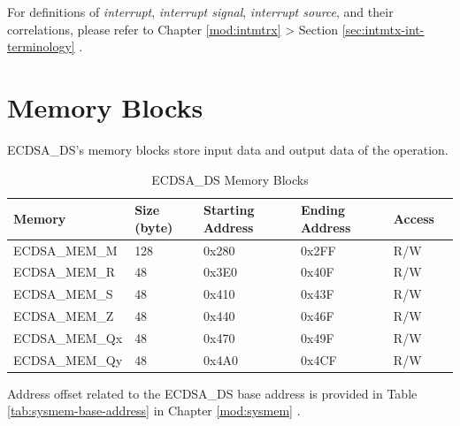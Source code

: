 \documentclass[main\_\_EN.tex]{subfiles}
\begin{document}
\begin{tiplisting}
For definitions of \textit{interrupt}, \textit{interrupt signal}, \textit{interrupt source}, and their correlations, please refer to Chapter \ref{mod:intmtrx} \textit{} > Section \ref{sec:intmtx-int-terminology} \textit{}.
\end{tiplisting}

\section{Memory Blocks}

ECDSA\_DS's memory blocks store input data and output data of the operation.

\begin{table}[H]
    \centering
    \caption{ECDSA\_DS Memory Blocks} \label{tab:ecdsa-memory}
    \begin{threeparttable}
    \begin{tabular}{ | l | l | l | l | l | l | }
    \hline
        \rowcolor{lightgray}
        \textbf{Memory} & \textbf{Size (byte)}  &  \textbf{Starting Address}\tnote{*} &  \textbf{Ending Address} \tnote{*} & \textbf{Access}   \\ \hline
        ECDSA\_MEM\_M    & 128 & 0x280 & 0x2FF & R/W \\ \hline
        ECDSA\_MEM\_R    & 48  & 0x3E0 & 0x40F & R/W \\ \hline
        ECDSA\_MEM\_S    & 48  & 0x410 & 0x43F & R/W \\ \hline
        ECDSA\_MEM\_Z    & 48  & 0x440 & 0x46F & R/W \\ \hline
        ECDSA\_MEM\_Qx   & 48  & 0x470 & 0x49F & R/W \\ \hline
        ECDSA\_MEM\_Qy   & 48  & 0x4A0 & 0x4CF & R/W \\ \hline
    \end{tabular}
    \begin{tablenotes}
        \item[*] Address offset related to the ECDSA\_DS base address is provided in Table \ref{tab:sysmem-base-address} in Chapter \ref{mod:sysmem} \textit{}.
    \end{tablenotes}
    \end{threeparttable}
\end{table}


\end{document}
